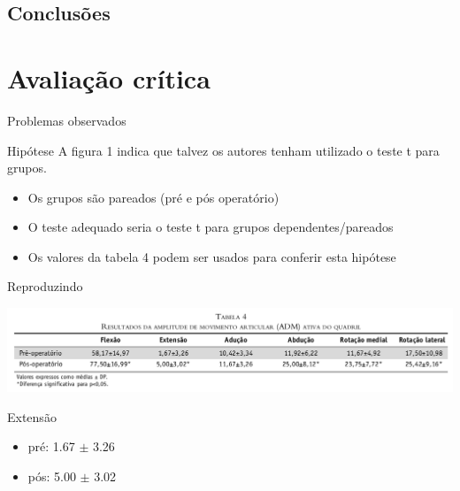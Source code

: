 \documentclass{beamer}
\begin{document}
\subsection{Conclusões}

\section{Avaliação crítica}

\begin{frame}{Problemas observados}
  \begin{block}{Hipótese}
    A figura 1 indica que talvez os autores tenham utilizado o teste t para grupos.
  \end{block}
  \begin{itemize}
  \item Os grupos são pareados (pré e pós operatório)
  \item O teste adequado seria o teste t para grupos dependentes/pareados
  \item Os valores da tabela 4 podem ser usados para conferir esta hipótese
  \end{itemize}
\end{frame}

\begin{frame}{Reproduzindo}
  \begin{center}
    \includegraphics[width=1.15\textwidth]{figuras/tabela4}
  \end{center}
  \begin{block}{Extensão}
    \begin{itemize}
    \item pré: 1.67 $\pm$ 3.26
    \item pós: 5.00 $\pm$ 3.02
    \end{itemize}
  \end{block}
\end{frame}
\end{document}
